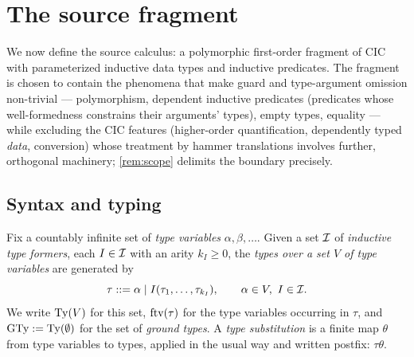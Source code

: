\section{The source fragment \Frag}
\label{sec:fragment}

We now define the source calculus: a polymorphic first-order fragment of CIC
with parameterized inductive data types and inductive predicates.  The
fragment is chosen to contain the phenomena that make guard and
type-argument omission non-trivial --- polymorphism, dependent inductive
predicates (predicates whose well-formedness constrains their arguments'
types), empty types, equality --- while excluding the CIC features
(higher-order quantification, dependently typed \emph{data}, conversion)
whose treatment by hammer translations involves further, orthogonal
machinery; \cref{rem:scope} delimits the boundary precisely.

\subsection{Syntax and typing}

\begin{definition}[Types]
  \label{def:types}
  Fix a countably infinite set of \emph{type variables}
  $\alpha, \beta, \dots$.  Given a set $\mathcal{I}$ of \emph{inductive type
  formers}, each $I \in \mathcal{I}$ with an arity $k_I \geq 0$, the \emph{types
  over a set $V$ of type variables} are generated by
  \[
    \tau ::= \alpha \mid I(\tau_1,\dots,\tau_{k_I}), \qquad \alpha \in V,\ I \in \mathcal{I}.
  \]
  We write $\mathrm{Ty}(V)$ for this set, $\mathrm{ftv}(\tau)$ for the type variables
  occurring in $\tau$, and $\mathrm{GTy} \mathrel{:=} \mathrm{Ty}(\emptyset)$ for the set of
  \emph{ground types}.  A \emph{type substitution} is a finite map
  $\theta$ from type variables to types, applied in the usual way and
  written postfix: $\tau\theta$.
\end{definition}

